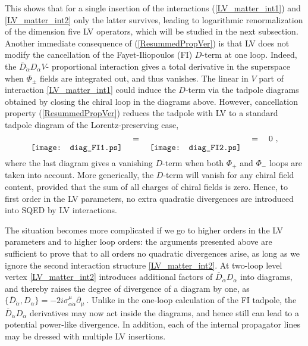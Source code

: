 \documentclass[12pt]{revtex4}
\begin{document}
%
This shows that for a single insertion of the interactions
(\ref{LV_matter_int1}) and \eqref{LV_matter_int2} only the latter
survives, leading to logarithmic renormalization of the dimension five
LV operators, which will be studied in the next subsection. 
Another immediate consequence of (\ref{ResummedPropVer}) is that LV
does not  modify the cancellation of the Fayet-Iliopoulos (FI)
$D$-term at one loop. Indeed, the 
$\overline{D}_{\dot\alpha}D_\alpha V$-
proportional interaction gives a total derivative in the superspace
when $\Phi_{\pm}$ fields are integrated out, and thus vanishes. 
The linear in $V$ part of interaction  \eqref{LV_matter_int1} could
induce the $D$-term via the tadpole diagrams obtained by closing the
chiral loop in the diagrams above. However, cancellation  property
(\ref{ResummedPropVer}) reduces the tadpole with LV to a standard 
tadpole diagram of the Lorentz-preserving case, 
%
\begin{equation}
\raisebox{-2.5ex}{\texttt{[image: diag\_FI1.ps]}}
\quad = \quad 
\raisebox{-2.5ex}{\texttt{[image: diag\_FI2.ps]}}
\quad = \quad 0~,
\end{equation}
%
where the last diagram gives a vanishing $D$-term when both $\Phi_+$
and $\Phi_-$ loops are taken into account. More generically, the
$D$-term will vanish for any chiral field content, provided that the
sum of all charges of chiral fields is zero. Hence, to first order in
the LV parameters, no extra quadratic divergences are introduced into
SQED by LV interactions. 


The situation becomes more complicated if we go to higher orders in 
the LV parameters and to higher loop orders: the arguments 
presented above are sufficient to
prove that to all orders no quadratic divergences arise, as long as we
ignore the second interaction structure \eqref{LV_matter_int2}. At two-loop 
level vertex \eqref{LV_matter_int2} introduces additional factors of $\overline{D}_{\dot\alpha}
D_\alpha$ into diagrams, and thereby raises 
the degree of divergence of a diagram by one, as 
\(
\{\overline{D}_{\dot\alpha}, D_\alpha\} = 
-2 i \sigma_{\alpha\dot\alpha}^\mu \partial_\mu~.
\) 
Unlike in the one-loop calculation of the FI tadpole, the 
$\overline{D}_{\dot\alpha} D_\alpha$ derivatives may now act inside
the diagrams, and hence still can lead to a potential power-like
divergence. In addition, each of the internal propagator lines may be
dressed with multiple LV insertions. 
\end{document}
